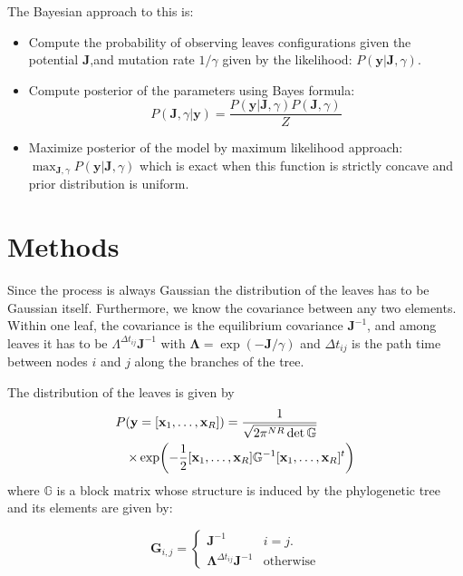 \documentclass[reprint,amsmath,amssymb,superscriptaddress,showpacs,pre]{revtex4-1}
\let\originalleft\left
\let\originalright\right
\renewcommand{\left}{\mathopen{}\mathclose\bgroup\originalleft}
\renewcommand{\right}{\aftergroup\egroup\originalright}
\begin{document}
The Bayesian approach  to this is:
\begin{itemize}
	\item Compute the probability of observing leaves configurations given the potential $\bm{J}$,and mutation rate $1/\gamma$ given by the likelihood: $P(\mathbf{y}\vert\bm{J},\gamma)$.
	\item Compute posterior of the parameters  using Bayes formula: $$P(\bm{J},\gamma\vert \mathbf{y}) = \frac{P(\mathbf{y}\vert\bm{J},\gamma)P(\bm{J},\gamma)}{Z}$$
	\item Maximize  posterior of the model by  maximum likelihood approach: $ \max_{\bm J,\gamma} P(\mathbf{y}\vert\bm{J},\gamma)$  which is exact  when this function is strictly concave and prior distribution is uniform.
\end{itemize}



\section{Methods}
\label{methods}
Since the process is always Gaussian the distribution of the leaves has to be Gaussian itself. Furthermore, we know the covariance between any two elements. Within one leaf, the covariance is the equilibrium covariance $\bm {J}^{-1}$, and among leaves it has to be $\Lambda^{\Delta t_{ij}}{\bm J^{-1}}  $
with $\bm \Lambda = \exp(-\bm J/\gamma)$ and $\Delta t_{ij}$ is the  path time   between nodes $i$ and $j$ along the branches of the tree.



The distribution of the leaves is given by 
\begin{eqnarray}
\nonumber
\lefteqn{P(\mathbf{y}=\left[ \mathbf{x}_1,\ldots,\mathbf{x}_R\right] ) = \frac 1 {\sqrt{ 2 \pi^{N R} \det \mathbb{G}}  }}\\%
&&\times \exp\left(-\frac 1 2 [\mathbf{x}_1,\ldots,\mathbf{x}_R] \mathbb{G}^{-1}[\mathbf{x}_1,\ldots,\mathbf{x}_R]^t \right)
\label{eqn:leaves_dist}
\end{eqnarray}
where $\mathbb{G}$ is a block matrix whose structure is induced by the  phylogenetic tree  and   its elements are given by: 


\begin{equation}
\bm G_{i,j} =
\begin{cases}
\bm J^{-1} & \text{$i=j$}.\\
\bm \Lambda^{\Delta t_{ij}}{\bm J^{-1}} & \text{otherwise}  
\end{cases}
\end{equation}
\end{document}
